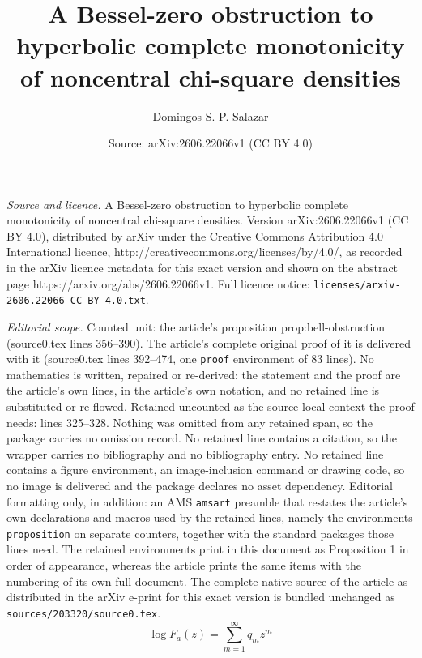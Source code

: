 \documentclass[10pt,a4paper]{amsart}
\title{A Bessel-zero obstruction to hyperbolic complete monotonicity of noncentral chi-square densities}
\author{Domingos S. P. Salazar}
\date{Source: arXiv:2606.22066v1 (CC BY 4.0)}
\begin{document}
\maketitle

\noindent\emph{Source and licence.} A Bessel-zero obstruction to hyperbolic complete monotonicity of noncentral chi-square densities. Version arXiv:2606.22066v1 (CC BY 4.0), distributed by arXiv under the Creative Commons Attribution 4.0 International licence, http://creativecommons.org/licenses/by/4.0/, as recorded in the arXiv licence metadata for this exact version and shown on the abstract page https://arxiv.org/abs/2606.22066v1. Full licence notice: \texttt{licenses/arxiv-2606.22066-CC-BY-4.0.txt}.\par\smallskip

\noindent\textit{Editorial scope.} Counted unit: the article's proposition prop:bell-obstruction (source0.tex lines 356--390). The article's complete original proof of it is delivered with it (source0.tex lines 392--474, one \texttt{proof} environment of 83 lines). No mathematics is written, repaired or re-derived: the statement and the proof are the article's own lines, in the article's own notation, and no retained line is substituted or re-flowed.  Retained uncounted as the source-local context the proof needs: lines 325--328.  Nothing was omitted from any retained span, so the package carries no omission record.  No retained line contains a citation, so the wrapper carries no bibliography and no bibliography entry.  No retained line contains a figure environment, an image-inclusion command or drawing code, so no image is delivered and the package declares no asset dependency.  Editorial formatting only, in addition: an AMS \texttt{amsart} preamble that restates the article's own declarations and macros used by the retained lines, namely the environments \texttt{proposition} on separate counters, together with the standard packages those lines need.  The retained environments print in this document as Proposition 1 in order of appearance, whereas the article prints the same items with the numbering of its own full document.  The complete native source of the article as distributed in the arXiv e-print for this exact version is bundled unchanged as \texttt{sources/203320/source0.tex}.
\begin{equation}
\label{eq:log-Fa}
\log F_a(z)=\sum_{m=1}^{\infty}q_m z^m
\end{equation}
\end{document}
